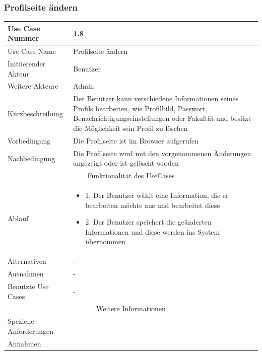 \documentclass[10pt,a4paper]{article}
\begin{document}
	\subsubsection{Profilseite \"andern}
		\begin{tabular}{|l|p{.5\linewidth}|}
		\hline Use Case Nummer & 1.8 \\ 
		\hline Use Case Name & Profilseite \"andern \\ 
		\hline Initiierender Akteur & Benutzer \\
		\hline Weitere Akteure & Admin \\
		\hline Kurzbeschreibung & Der Benutzer kann verschiedene Informationen seines Profils bearbeiten, wie Profilbild, Passwort, Benachrichtigungseinstellungen oder Fakultät und besitzt die Möglichkeit sein Profil zu löschen \\
		\hline Vorbedingung & Die Profilseite ist im Browser aufgerufen \\
		\hline Nachbedingung & Die Profilseite wird mit den vorgenommenen \"Anderungen angezeigt oder ist gel\"oscht worden \\
		\hline \multicolumn{2}{|c|}{Funktionalität des UseCases}\\
		\hline Ablauf & \begin{itemize}
					\item 1. Der Benutzer w\"ahlt eine Information, die er bearbeiten m\"ochte aus und bearbeitet diese
					\item 2. Der Benutzer speichert die ge\"anderten Informationen und diese werden ins System \"ubernommen
				\end{itemize}\\
		\hline Alternativen & - \\
		\hline Ausnahmen & - \\
		\hline Benutzte Use Cases & - \\
		\hline \multicolumn{2}{|c|}{Weitere Informationen} \\
		\hline Spezielle Anforderungen &  \\
		\hline Annahmen &  \\
		\hline
		\end{tabular}
		
\end{document}
